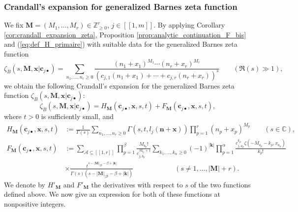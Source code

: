 \documentclass[a4paper]{amsart}
\theoremstyle{remark}
\theoremstyle{definition}
\begin{document}
\subsubsection{Crandall's expansion for generalized Barnes zeta function}
\label{subsubsection:crandall_expansion_barnes}

We fix $\mathbf{M}=(M_1,\ldots,M_r) \in \mathbb{Z}_{\geq 0}^r$, $j \in [\![ 1,m ]\!]$. By applying Corollary \ref{cor:crandall_expansion_zeta}, Proposition \ref{prop:analytic_continuation_F_bis} and (\ref{eq:def_H_primaire}) with suitable data for the generalized Barnes zeta function
$$ \zeta_B(s,\mathbf{M},\mathbf{x}|\mathbf{c}_{j\bullet}) = \sum_{n_1,\ldots,n_r \geq 0} \frac{(n_1+x_1)^{M_1}\cdots(n_r+x_r)^{M_r}}{(c_{j,1}(n_1+x_1)+\cdots+c_{j,r}(n_r+x_r))^s} \qquad (\Re(s) \gg 1), $$
we obtain the following Crandall's expansion for the generalized Barnes zeta function $\zeta_B(s,\mathbf{M},\mathbf{x}|\mathbf{c}_{j\bullet})$:
\begin{equation}
    \label{eq:crandall_expansion_generalized_barnes}
    \zeta_B(s,\mathbf{M},\mathbf{x}|\mathbf{c}_{j\bullet}) = H_{\mathbf{M}}(\mathbf{c}_{j \bullet},\mathbf{x},s,t)+F_{\mathbf{M}}(\mathbf{c}_{j \bullet},\mathbf{x},s,t), 
\end{equation}
where $t>0$ is sufficiently small, and
\begin{align}
    H_{\mathbf{M}}(\mathbf{c}_{j \bullet},\mathbf{x},s,t)& := \frac{1}{\Gamma(s)} \sum_{n_1,\ldots,n_{r} \geq 0} \Gamma(s,t,l_j(\mathbf{n}+\mathbf{x})) \prod_{p=1}^{r} (n_p+x_p)^{M_p} \qquad (s \in \mathbb{C}), \label{eq:h_generalized_barnes_formula} \\
    F_{\mathbf{M}}(\mathbf{c}_{j \bullet},\mathbf{x},s,t)& := \sum_{\mathcal{A} \subseteq [\![1,r]\!]} \prod_{p=1}^{\beta} \frac{M_{b_p}!}{c_{j,b_p}^{M_{b_p}+1}} \sum_{k_1,\ldots,k_{\alpha} \geq 0} (-1)^{|\mathbf{k}|} \prod_{p=1}^{\alpha} \frac{c_{j,a_p}^{k_p}\zeta(-M_{a_p}-k_p,x_{a_p})}{k_p!} \label{eq:j_generalized_barnes_formula} \\
    & \times \frac{t^{s-|\mathbf{M}|_{|\mathcal{B}}-\beta+|\mathbf{k}|}}{\Gamma(s)(s-|\mathbf{M}|_{|\mathcal{B}}-\beta+|\mathbf{k}|)}  \qquad \qquad \qquad (s \neq 1,\ldots,|\mathbf{M}|+r). \nonumber
\end{align}
We denote by $H'_{\mathbf{M}}$ and $F'_{\mathbf{M}}$ the derivatives with respect to $s$ of the two functions defined above. We now give an expression for both of these functions at nonpositive integers.
\end{document}
